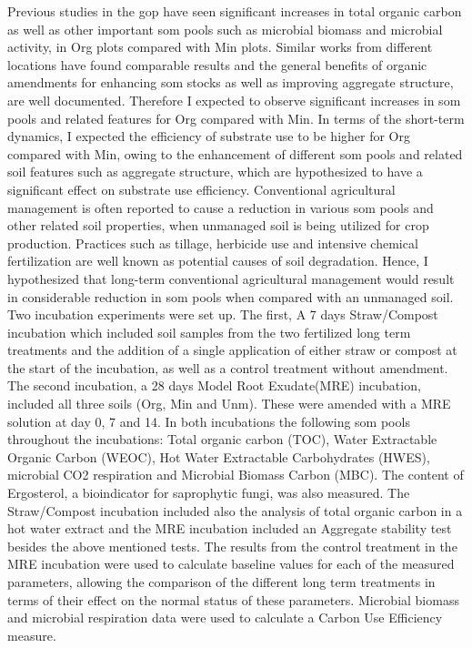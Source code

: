 Previous studies in the \gls{gop} have seen significant increases in total organic carbon as well as other important \gls{som} pools such as microbial biomass and microbial activity, in Org plots compared with Min plots. Similar works from different locations have found comparable results and the general benefits of organic amendments for enhancing \gls{som} stocks as well as improving aggregate  structure, are well documented. Therefore I expected to observe significant increases in \gls{som} pools and related features for Org compared with Min. In terms of the short-term dynamics, I expected the efficiency of substrate use to be higher for Org compared with Min, owing to the enhancement of different \gls{som} pools and related soil features such as aggregate structure, which are hypothesized to have a significant effect on substrate use efficiency. 
Conventional agricultural management is often reported to cause a reduction in various \gls{som} pools and other related soil properties, when unmanaged soil is being utilized for crop production. Practices such as tillage, herbicide use and intensive chemical fertilization are well known as potential causes of soil degradation. Hence, I hypothesized that long-term conventional agricultural management would result in considerable reduction in \gls{som} pools when compared with an unmanaged soil.\\
Two incubation experiments were set up. The first, A 7 days Straw/Compost incubation which included soil samples from the two fertilized long term treatments and the addition of a single application of either straw or compost at the start of the incubation, as well as a control treatment without amendment. The second incubation, a 28 days Model Root Exudate(MRE) incubation, included all three soils (Org, Min and Unm). These were amended with a MRE solution at day 0, 7 and 14. In both incubations the following \gls{som} pools throughout the incubations: Total organic carbon (TOC), Water Extractable Organic Carbon (WEOC), Hot Water Extractable Carbohydrates (HWES), microbial CO2 respiration and Microbial Biomass Carbon (MBC). The content of Ergosterol, a bioindicator for saprophytic fungi, was also measured. The Straw/Compost incubation included also the analysis of total organic carbon in a hot water extract and the MRE incubation included an Aggregate stability test besides the above mentioned tests.  The results from the control treatment in the MRE incubation were used to calculate baseline values for each of the measured parameters, allowing the comparison of the different long term treatments in terms of their effect on the normal status of these parameters. Microbial biomass and microbial respiration data were used to calculate a Carbon Use Efficiency measure.\\
